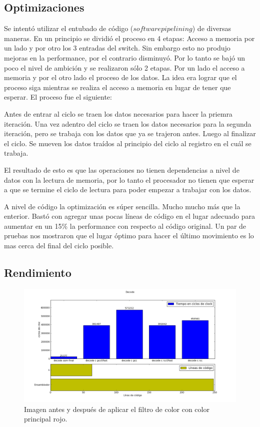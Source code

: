 \subsection{Optimizaciones}

	Se intentó utilizar el entubado de código ($software pipelining$) de diversas maneras.
En un principio se dividió el proceso en 4 etapas: Acceso a memoria por un lado
y por otro los 3 entradas del switch. Sin embargo esto no produjo mejoras en la performance,
por el contrario disminuyó. Por lo tanto se bajó un poco el nivel de ambición y se realizaron
sólo 2 etapas. Por un lado el acceso a memoria y por el otro lado el proceso de los datos. La idea
era lograr que el proceso siga mientras se realiza el acceso a memoria en lugar de tener que esperar.
El proceso fue el siguiente:

	Antes de entrar al ciclo se traen los datos necesarios para hacer la priemra iteración.
Una vez adentro del ciclo se traen los datos necesarios para la segunda iteración, pero
se trabaja con los datos que ya se trajeron antes. Luego al finalizar el ciclo.
Se mueven los datos traídos al principio del ciclo al registro en el cuál se trabaja.

	El resultado de esto es que las operaciones no tienen dependencias a nivel de datos con
la lectura de memoria, por lo tanto el procesador no tienen que esperar a que se termine el ciclo
de lectura para poder empezar a trabajar con los datos.

	A nivel de código la optimización es súper sencilla. Mucho mucho más que la enterior.
Bastó con agregar unas pocas líneas de código en el lugar adecuado para aumentar en un 15\% la performance
con respecto al código original. Un par de pruebas nos mostraron que el lugar óptimo para hacer el último
movimiento es lo mas cerca del final del ciclo posible.

\subsection{Rendimiento}

\begin{figure}[h]
\begin{center}
  \includegraphics[scale=0.5]{secciones/decodificacion/imagenes/decode.png}
\end{center}
\caption{Imagen antes y después de aplicar el filtro de color con color principal rojo.}
\label{fig:filtro-color-ejemplo}
\end{figure}

